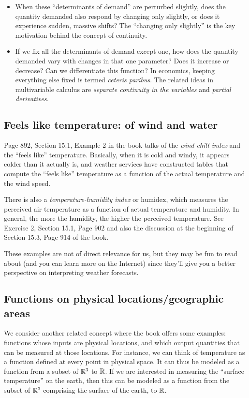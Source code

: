 \documentclass[10pt]{amsart}
\begin{document}
\begin{itemize}
\item When these ``determinants of demand'' are perturbed slightly,
  does the quantity demanded also respond by changing only slightly,
  or does it experience sudden, massive shifts? The ``changing only
  slightly'' is the key motivation behind the concept of continuity.
\item If we fix all the determinants of demand except one, how does
  the quantity demanded vary with changes in that one parameter? Does
  it increase or decrease? Can we differentiate this function? In
  economics, keeping everything else fixed is termed {\em ceteris
  paribus}. The related ideas in multivariable calculus are {\em
  separate continuity in the variables} and {\em partial derivatives}.
\end{itemize}

\subsection{Feels like temperature: of wind and water}

Page 892, Section 15.1, Example 2 in the book talks of the {\em wind
chill index} and the ``feels like'' temperature. Basically, when it is
cold and windy, it appears colder than it actually is, and weather
services have constructed tables that compute the ``feels like''
temperature as a function of the actual temperature and the wind
speed.

There is also a {\em temperature-humidity index} or humidex, which
measures the perceived air temperature as a function of actual
temperature and humidity. In general, the more the humidity, the
higher the perceived temperature. See Exercise 2, Section 15.1, Page
902 and also the discussion at the beginning of Section 15.3, Page 914
of the book.

These examples are not of direct relevance for us, but they may be fun
to read about (and you can learn more on the Internet) since they'll
give you a better perspective on interpreting weather forecasts.

\subsection{Functions on physical locations/geographic areas}

We consider another related concept where the book offers some
examples: functions whose inputs are physical locations, and which
output quantities that can be measured at those locations. For
instance, we can think of temperature as a function defined at every
point in physical space. It can thus be modeled as a function from a
subset of $\mathbb{R}^3$ to $\mathbb{R}$. If we are interested in measuring the
``surface temperature'' on the earth, then this can be modeled as a
function from the subset of $\mathbb{R}^3$ comprising the surface of the
earth, to $\mathbb{R}$.
\end{document}
